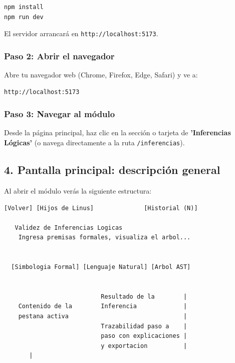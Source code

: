 \documentclass[11pt,a4paper]{article}
\begin{document}
\begin{lstlisting}[language={},basicstyle=\ttfamily\scriptsize]
npm install
npm run dev
\end{lstlisting}

El servidor arrancará en \texttt{http://localhost:5173}.

\subsubsection{Paso 2: Abrir el navegador}

Abre tu navegador web (Chrome, Firefox, Edge, Safari) y ve a:

\begin{lstlisting}[language={},basicstyle=\ttfamily\scriptsize]
http://localhost:5173
\end{lstlisting}

\subsubsection{Paso 3: Navegar al módulo}

Desde la página principal, haz clic en la sección o tarjeta de \textbf{'Inferencias Lógicas'} (o navega directamente a la ruta \texttt{/inferencias}).

\hrulefill

\subsection{4. Pantalla principal: descripción general}

Al abrir el módulo verás la siguiente estructura:

\begin{lstlisting}[language={},basicstyle=\ttfamily\scriptsize]
  [Volver] [Hijos de Linus]              [Historial (N)] 
                                                         
   Validez de Inferencias Logicas                       
    Ingresa premisas formales, visualiza el arbol...     

                                                         
  [Simbologia Formal] [Lenguaje Natural] [Arbol AST]     
                                                         
       
                           Resultado de la        |   
    Contenido de la        Inferencia             |   
    pestana activa                                |   
                           Trazabilidad paso a    |   
                           paso con explicaciones |   
                           y exportacion          |   
       |
                                                         
\end{lstlisting}
\end{document}

